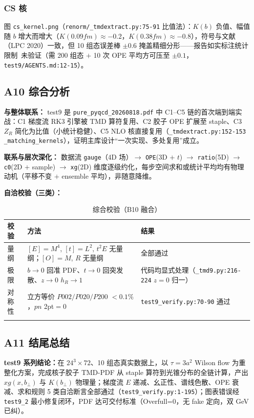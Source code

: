 \documentclass[UTF8]{ctexart}
\begin{document}
\subsubsection{CS 核}
图 \texttt{\nolinkurl{cs\_kernel.png}}（\texttt{\nolinkurl{renorm/\_tmdextract.py:75-91}} 比值法）：$K(b)$ 负值、幅值随 $b$ 增大而增大（$K(0.09fm)\approx-0.2$，$K(0.38fm)\approx-0.8$），符号与文献（LPC 2020）一致，但 10 组态误差棒 $\pm0.6$ 掩盖精细分形——报告如实标注统计限制\ \textcolor{warn}{未验证}（需 200 组态 $+$ 10 次 OPE 平均方可压至 $\pm0.1$，\texttt{\nolinkurl{test9/AGENTS.md:12-15}}）。

\subsection{A10 综合分析}
\label{sec:a10}
\textbf{与整体联系：} test9 是 \texttt{\nolinkurl{pure\_pyqcd\_20260818.pdf}} 中 C1--C5 链的首次端到端实战：C1 梯度流 RK3 引擎被 TMD 算符复用、C2 胶子 OPE 扩展至 staple、C3 $Z_R$ 简化为比值（小统计稳健）、C5 NLO 核直接复用（\texttt{\nolinkurl{\_tmdextract.py:152-153}} \texttt{\nolinkurl{\_matching\_kernels}}），证明主库设计“一次实现、多处复用”成立。

\textbf{联系与层次深化：} 数据流 \texttt{\nolinkurl{gauge}}（4D 场）$\rightarrow$ \texttt{\nolinkurl{OPE}}(3D $+$ $t$) $\rightarrow$ \texttt{\nolinkurl{ratio}}(5D) $\rightarrow$ \texttt{\nolinkurl{c0}}(2D $+$ sample) $\rightarrow$ \texttt{\nolinkurl{xg}}(2D) 维度逐级约化，每步空间求和或统计平均均有物理动机（平移不变 $+$ ensemble 平均），非随意降维。

\textbf{自洽校验（三类）：}
\small
\begin{xltabular}{\textwidth}{llX}
\toprule
校验 & 方法 & 结果 \\
\midrule
\endhead
量纲 & $[E]=M^4$, $[t]=L^2$, $t^2E$ 无量纲；$[O]=M$, $R$ 无量纲 & 全部通过 \\
极限 & $b\to0$ 回准 PDF、$t\to0$ 回突发散、$z\to0$ $h_R\to1$ & 代码均显式处理（\texttt{\nolinkurl{\_tmd9.py:216-224}} $z=0$ 归一）\\
对称性 & 立方等价 $P002/P020/P200$ $<0.1\%$，$pn$ 2pt$=0$ & \texttt{\nolinkurl{test9\_verify.py:70-90}} 通过 \\
\bottomrule
\caption{综合校验（B10 融合）}
\end{xltabular}

\subsection{A11 结尾总结}
\begin{conclbox}
\textbf{test9 系列结论：}在 $24^3\times72$、10 组态真实数据上，以 $\tau=3a^2$ Wilson flow 为重整化方案，完成核子胶子 TMD-PDF 从 staple 算符到光锥分布的全链计算，产出 $xg(x,b_\perp)$ 与 $K(b_\perp)$ 物理量；梯度流 $E$ 递减、幺正性、谱线色散、OPE 衰减、求和规则 5 类自洽断言全部通过（\texttt{\nolinkurl{test9\_verify.py:1-195}}）；图表错误经 \texttt{\nolinkurl{test9\_2}} 最小修复闭环，PDF 达可交付标准（Overfull=0，无 fake 定向，双 GeV 已纠）。
\end{conclbox}
\end{document}
